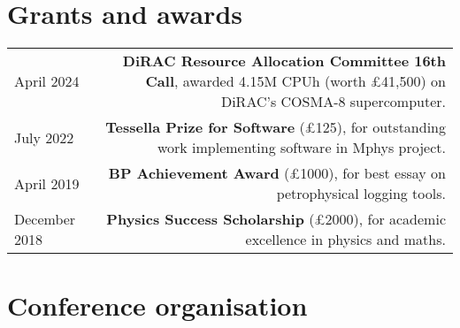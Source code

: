 \documentclass{article}
\begin{document}
\section*{Grants and awards}

\begin{tabular}{L!{\vrule}R}

    April 2024 & \textbf{DiRAC Resource Allocation Committee 16th Call}, awarded 4.15M CPUh (worth £41,500) on DiRAC's COSMA-8 supercomputer. \\
    July 2022 & \textbf{Tessella Prize for Software} (£125), for outstanding work implementing software in Mphys project. \\
    April 2019 & \textbf{BP Achievement Award} (£1000), for best essay on petrophysical logging tools. \\
    December 2018 & \textbf{Physics Success Scholarship} (£2000), for academic excellence in physics and maths.\\

\end{tabular}

\begin{comment}
\section*{Posters Presentations}

\begin{tabular}{L!{\vrule}R}
	March 2021 & \href{https://github.com/htjb/Talks/blob/master/Posters/SKA_globalemu_March_2021/globalemu.pdf}{\textit{globalemu: A novel and robust approach for emulating the sky averaged 21-cm signal from the cosmic dawn and epoch of reionization}}, A Precursor View of the SKA Sky, Virtual Conference\\
	December 2019 & \href{https://drive.google.com/file/d/1dvgumyu4cXxXqoYxikU3DKOa4u_gpGzn/view}{\textit{REACH: Radio Experiment for the Analysis of Cosmic Hydrogen}}, Science At Low Frequencies VI, Arizona State University \\
	November 2019 & \href{https://github.com/htjb/Talks/blob/master/Posters/Cav_Graduate_Conf_REACH_Nov_2019/REACH_poster.pdf}{\textit{REACH: Radio Experiment for the Analysis of Cosmic Hydrogen}}, Cavendish Graduate Conference, University of Cambridge
\end{tabular}
\end{comment}

\section*{Conference organisation}
\end{document}
